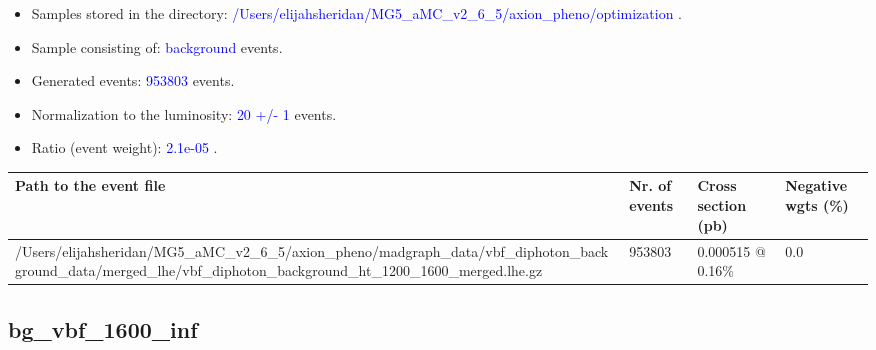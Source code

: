 \documentclass[a4paper, 10pt]{article}
\begin{document}
\begin{itemize}
  \item Samples stored in the directory: \textcolor{blue}{/\-Users/\-elijahsheridan/\-MG5\_aMC\_v2\_6\_5/\-axion\_pheno/\-optimization} .
   \item Sample consisting of: \textcolor{blue}{background}  events.
   \item Generated events: \textcolor{blue}{953803 }  events.
   \item Normalization to the luminosity: \textcolor{blue}{20}\textcolor{blue}{ +/\-- }\textcolor{blue}{1 }  events.
   \item Ratio (event weight): \textcolor{blue}{2.1e-05 } .  
 
\end{itemize}
\begin{table}[H]
  \begin{center}
    \begin{tabular}{|m{55.0mm}|m{25.0mm}|m{30.0mm}|m{30.0mm}|}
      \hline
      {\cellcolor{yellow}         Path to the event file}& {\cellcolor{yellow}         Nr. of events}& {\cellcolor{yellow}         Cross section (pb)}& {\cellcolor{yellow}         Negative wgts (\%)}\\
      \hline
      {\cellcolor{white}          /\-Users/\-elijahsheridan/\-MG5\_aMC\_v2\_6\_5/\-axion\_pheno/\-madgraph\_data/\-vbf\_diphoton\_background\_data/\-merged\_lhe/\-vbf\_diphoton\_background\_ht\_1200\_1600\_merged.lhe.gz}& {\cellcolor{white}          953803}& {\cellcolor{white}          0.000515 @ 0.16\%}& {\cellcolor{white}          0.0}\\
\hline
    \end{tabular}
  \end{center}
\end{table}

\subsection{ bg\_vbf\_1600\_inf}
\end{document}
